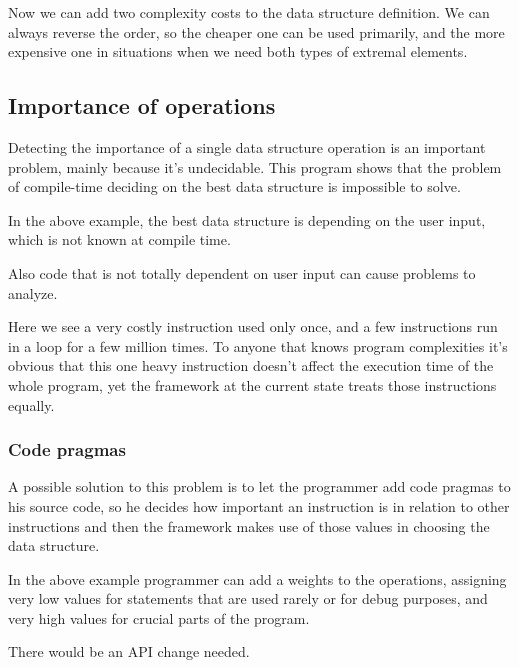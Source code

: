 \documentclass[11pt]{article}
\begin{document}
		Now we can add two complexity costs to the data structure definition. We can always reverse the order,
		so the cheaper one can be used primarily, and the more expensive one in situations when we need both
		types of extremal elements.

	\subsection{Importance of operations}

		Detecting the importance of a single data structure operation is an important problem,
		mainly because it's undecidable. This program shows that the problem of compile-time deciding on the
		best data structure is impossible to solve.

		

		In the above example, the best data structure is depending on the user input, which is not known at
		compile time.

		Also code that is not totally dependent on user input can cause problems to analyze.

		

		Here we see a very costly instruction used only once, and a few instructions run in a loop for a few
		million times.  To anyone that knows program complexities it's obvious that this one heavy instruction
		doesn't affect the execution time of the whole program, yet the framework at the current state treats
		those instructions equally.

		\subsubsection{Code pragmas}

			A possible solution to this problem is to let the programmer add code pragmas to his source
			code, so he decides how important an instruction is in relation to other instructions and then
			the framework makes use of those values in choosing the data structure.

			

			In the above example programmer can add a weights to the operations, assigning very low values
			for statements that are used rarely or for debug purposes, and very high values for crucial
			parts of the program.

			There would be an API change needed.
\end{document}
